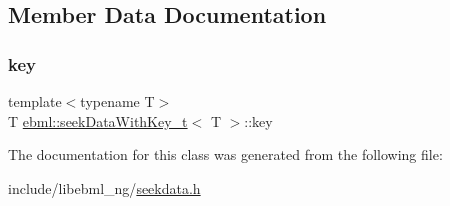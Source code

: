 \subsection{Member Data Documentation}
\mbox{\label{classebml_1_1seekDataWithKey__t_a5cc5af451ed608f03c4e68ef29651d9c}} 
\subsubsection{\texorpdfstring{key}{key}}
{\footnotesize\ttfamily template$<$typename T$>$ \\
T \mbox{\hyperlink{classebml_1_1seekDataWithKey__t}{ebml\+::seek\+Data\+With\+Key\+\_\+t}}$<$ T $>$\+::key}



The documentation for this class was generated from the following file\+:\begin{DoxyCompactItemize}
\item 
include/libebml\+\_\+ng/\mbox{\hyperlink{seekdata_8h}{seekdata.\+h}}\end{DoxyCompactItemize}
